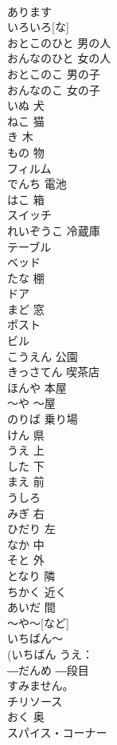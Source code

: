 \documentclass[8pt]{extreport}
\begin{document}
\begin{CJK}{UTF8}{min}
\\	あります			
\\	いろいろ[な]			
\\	おとこのひと	男の人	
\\	おんなのひと	女の人	
\\	おとこのこ	男の子	
\\	おんなのこ	女の子	
\\	いぬ	犬	
\\	ねこ	猫	
\\	き	木	
\\	もの	物	
\\	フィルム			
\\	でんち	電池	
\\	はこ	箱	
\\	スイッチ			
\\	れいぞうこ	冷蔵庫	
\\	テーブル			
\\	ベッド			
\\	たな	棚	
\\	ドア			
\\	まど	窓	
\\	ポスト			
\\	ビル			
\\	こうえん	公園	
\\	きっさてん	喫茶店	
\\	ほんや	本屋	
\\	～や	～屋	
\\	のりば	乗り場	
\\	けん	県	
\\	うえ	上	
\\	した	下	
\\	まえ	前	
\\	うしろ			
\\	みぎ	右	
\\	ひだり	左	
\\	なか	中	
\\	そと	外	
\\	となり	隣	
\\	ちかく	近く	
\\	あいだ	間	
\\	～や～[など] 
\\	いちばん～			
\\	(いちばん うえ：
\\	―だんめ	―段目	
\\	[どうも]すみません。			
\\	チリソース			
\\	おく	奥	
\\	スパイス・コーナー			

\end{CJK}
\end{document}
